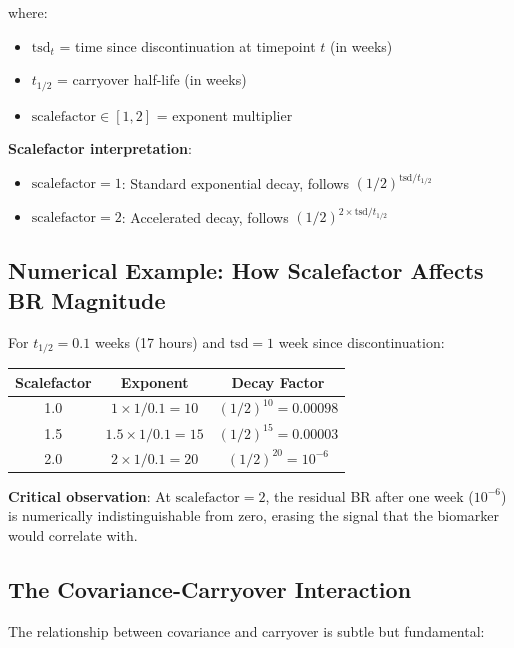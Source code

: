 \documentclass[12pt,a4paper]{article}
\begin{document}
where:
\begin{itemize}
\item $\text{tsd}_t$ = time since discontinuation at timepoint $t$ (in weeks)
\item $t_{1/2}$ = carryover half-life (in weeks)
\item $\text{scalefactor} \in [1, 2]$ = exponent multiplier
\end{itemize}

\textbf{Scalefactor interpretation}:
\begin{itemize}
\item $\text{scalefactor} = 1$: Standard exponential decay, follows $(1/2)^{\text{tsd}/t_{1/2}}$
\item $\text{scalefactor} = 2$: Accelerated decay, follows $(1/2)^{2 \times \text{tsd}/t_{1/2}}$
\end{itemize}

\subsection{Numerical Example: How Scalefactor Affects BR Magnitude}

For $t_{1/2} = 0.1$ weeks (17 hours) and $\text{tsd} = 1$ week since discontinuation:

\begin{center}
\begin{tabular}{ccc}
\toprule
\textbf{Scalefactor} & \textbf{Exponent} & \textbf{Decay Factor} \\
\midrule
1.0 & $1 \times 1 / 0.1 = 10$ & $(1/2)^{10} = 0.00098$ \\
1.5 & $1.5 \times 1 / 0.1 = 15$ & $(1/2)^{15} = 0.00003$ \\
2.0 & $2 \times 1 / 0.1 = 20$ & $(1/2)^{20} = 10^{-6}$ \\
\bottomrule
\end{tabular}
\end{center}

\textbf{Critical observation}: At $\text{scalefactor} = 2$, the residual BR after one week ($10^{-6}$) is numerically indistinguishable from zero, erasing the signal that the biomarker would correlate with.

\subsection{The Covariance-Carryover Interaction}

The relationship between covariance and carryover is subtle but fundamental:
\end{document}
